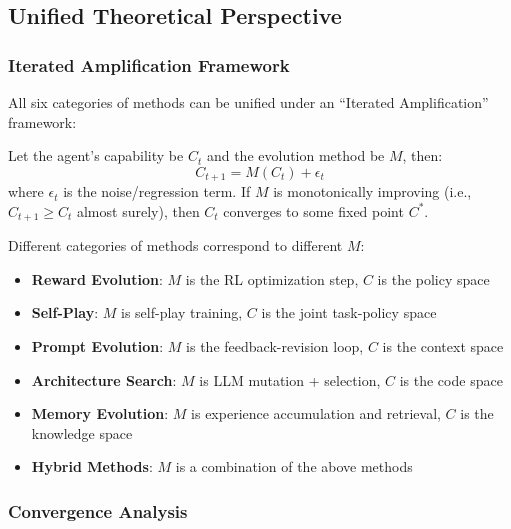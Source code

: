 \subsection{Unified Theoretical Perspective}\label{sec:ch3-unified}

\subsubsection{Iterated Amplification Framework}

All six categories of methods can be unified under an ``Iterated Amplification'' framework:

\begin{definition}
Let the agent's capability be $C_t$ and the evolution method be $M$, then:
\begin{equation}
C_{t+1} = M(C_t) + \epsilon_t
\label{eq:iterated-amplification}
\end{equation}
where $\epsilon_t$ is the noise/regression term. If $M$ is monotonically improving (i.e., $C_{t+1} \geq C_t$ almost surely), then $C_t$ converges to some fixed point $C^*$.
\end{definition}

Different categories of methods correspond to different $M$:
\begin{itemize}
\item \textbf{Reward Evolution}: $M$ is the RL optimization step, $C$ is the policy space
\item \textbf{Self-Play}: $M$ is self-play training, $C$ is the joint task-policy space
\item \textbf{Prompt Evolution}: $M$ is the feedback-revision loop, $C$ is the context space
\item \textbf{Architecture Search}: $M$ is LLM mutation + selection, $C$ is the code space
\item \textbf{Memory Evolution}: $M$ is experience accumulation and retrieval, $C$ is the knowledge space
\item \textbf{Hybrid Methods}: $M$ is a combination of the above methods
\end{itemize}

\subsubsection{Convergence Analysis}

